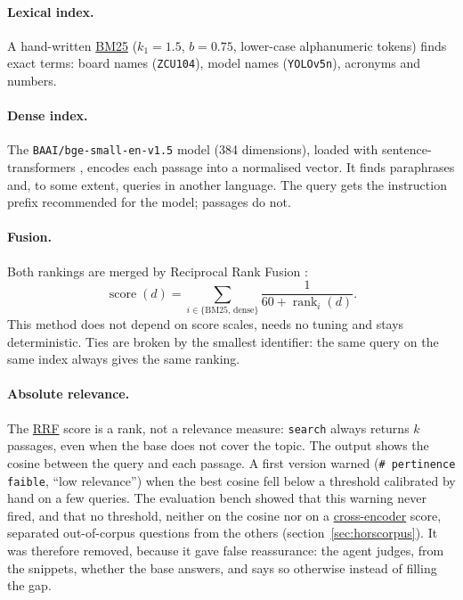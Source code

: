 \documentclass[11pt,a4paper]{article}
\newcommand{\cmd}[1]{\texttt{#1}}
\newcommand{\gl}[2]{\hyperlink{gl:#1}{\textcolor{glcolor}{#2}}}
\begin{document}
\paragraph{Lexical index.} A hand-written \gl{BM25}{BM25} \citep{robertson2009bm25} ($k_1 = 1.5$,
$b = 0.75$, lower-case alphanumeric tokens) finds exact terms: board names (\cmd{ZCU104}),
model names (\cmd{YOLOv5n}), acronyms and numbers.

\paragraph{Dense index.} The \cmd{BAAI/bge-small-en-v1.5} model \citep{xiao2024cpack}
(384 dimensions), loaded with sentence-transformers \citep{reimers2019sbert}, encodes each
passage into a normalised vector. It finds paraphrases and, to some extent, queries in
another language. The query gets the instruction prefix recommended for the model; passages
do not.

\paragraph{Fusion.} Both rankings are merged by Reciprocal Rank Fusion
\citep{cormack2009rrf}:
\begin{equation}
  \operatorname{score}(d) = \sum_{i \in \{\text{BM25},\,\text{dense}\}}
    \frac{1}{60 + \operatorname{rank}_i(d)} .
\end{equation}
This method does not depend on score scales, needs no tuning and stays deterministic. Ties
are broken by the smallest identifier: the same query on the same index always gives the
same ranking.

\paragraph{Absolute relevance.} The \gl{RRF}{RRF} score is a rank, not a relevance measure:
\cmd{search} always returns $k$ passages, even when the base does not cover the topic. The
output shows the cosine between the query and each passage. A first version warned
(\cmd{\# pertinence faible}, ``low relevance'') when the best cosine fell below a threshold
calibrated by hand on a few queries. The evaluation bench showed that this warning never
fired, and that no threshold, neither on the cosine nor on a \gl{crossenc}{cross-encoder} score, separated
out-of-corpus questions from the others (section~\ref{sec:horscorpus}). It was therefore
removed, because it gave false reassurance: the agent judges, from the snippets, whether the
base answers, and says so otherwise instead of filling the gap.
\end{document}

